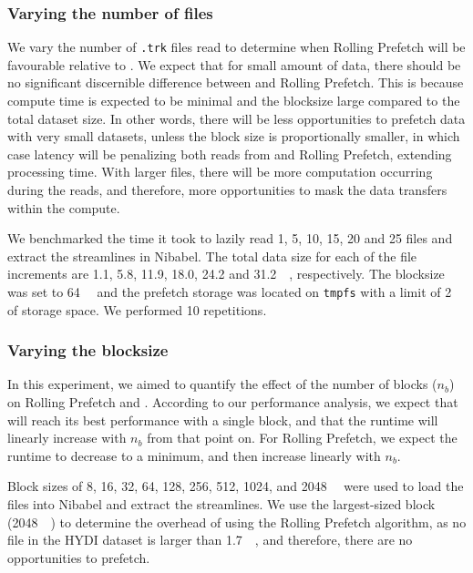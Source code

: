 \subsubsection{Varying the number of files}\label{exp:files}

We vary the number of \texttt{.trk} files read to determine when Rolling Prefetch will be favourable relative to \sfs. We expect that for small amount of data, there should be no significant discernible difference between \sfs and Rolling Prefetch. This is because compute time is
expected to be minimal and the blocksize large compared to the total dataset size. In other words, there
will be less opportunities to prefetch data with very small datasets, unless the block size is proportionally smaller,
in which case latency will be penalizing both reads from \sfs and Rolling Prefetch, extending processing time. With larger files, there will be more computation occurring during the reads, and therefore, more opportunities
to mask the data transfers within the compute.

We benchmarked the time it took to lazily read 1, 5, 10, 15, 20 and 25 files and extract the streamlines in Nibabel.
The total data size for each of the file increments are 1.1, 5.8, 11.9, 18.0, 24.2 and \SI{31.2}{\gibi\byte},
respectively. The blocksize was set to \SI{64}{\mebi\byte} and the prefetch storage was located on \texttt{tmpfs} with
a limit of \SI{2}{\gibi\byte} of storage space. We performed 10 repetitions.

\subsubsection{Varying the blocksize}\label{exp:blocksize}
In this experiment, we aimed to quantify the effect of the number of blocks ($n_b$) on Rolling Prefetch and \sfs. According to our performance analysis, we expect that \sfs will reach its best performance with a single block, and that the runtime will linearly increase with $n_b$ from that point on. For Rolling Prefetch, we expect the runtime to decrease to a minimum, and then increase linearly with $n_b$.


Block sizes of 8, 16, 32, 64, 128, 256, 512, 1024,
and \SI{2048}{\mebi\byte} were used to load the files into Nibabel and extract the streamlines.
We use the 
largest-sized block (\SI{2048}{\mebi\byte}) to determine the
overhead of using the Rolling Prefetch algorithm, as no file in the HYDI dataset is larger than \SI{1.7}{\gibi\byte},
and therefore, there are no opportunities to prefetch.

